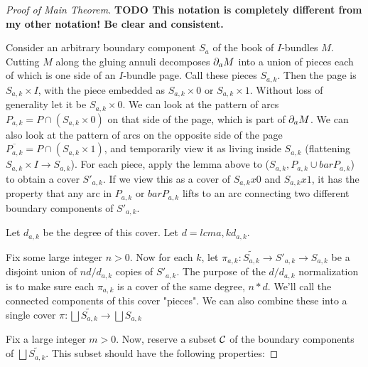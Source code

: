 \begin{proof}[Proof of Main Theorem]


\textbf{ TODO This notation is completely different from my other notation! Be
clear and consistent.}

Consider an arbitrary boundary component $S_a$ of the book of $I$-bundles $M$.
Cutting $M$ along the gluing annuli decomposes $\partial_aM$ into a union of pieces
each of which is one side of an $I$-bundle page. Call these pieces $S_{a,k}$.
Then the page is $S_{a,k}\times I$, with the piece embedded as $S_{a,k}\times
0$ or $S_{a,k}\times 1$. Without loss of generality let it be $S_{a,k}\times
0$. We can look at the pattern of arcs $P_{a,k} = P \cap (S_{a,k}\times 0)$ on
that side of the page, which is part of $\partial_aM$. We can also look at the pattern
of arcs on the opposite side of the page $\overline{P_{a,k}} = P \cap
(S_{a,k}\times 1)$, and temporarily view it as living inside $S_{a,k}$
(flattening $S_{a,k}\times I \to S_{a,k}$).  For each piece, apply the lemma
above to ($S_{a,k},P_{a,k} \cup barP_{a,k}$) to obtain a cover $S'_{a,k}$. If we
view this as a cover of $S_{a,k}x0$ and $S_{a,k}x1$, it has the property that
any arc in $P_{a,k}$ or $barP_{a,k}$ lifts to an arc connecting two different
boundary components of $S'_{a,k}$.

Let $d_{a,k}$ be the degree of this cover. Let $d = lcm a,k d_{a,k}$.

Fix some large integer $n>0$. Now for each $k$, let $\pi_{a,k}
\colon \widetilde{S_{a,k}} \to S'_{a,k} \to S_{a,k}$ be a disjoint union of $nd/d_{a,k}$
copies of $S'_{a,k}$. The purpose of the $d/d_{a,k}$ normalization is to make sure
each $\pi_{a,k}$ is a cover of the same degree, $n*d$.  We'll call the connected
components of this cover "pieces". We can also combine these into a single
cover $\pi \colon \bigsqcup \widetilde{S_{a,k}} \to \bigsqcup S_{a,k}$

Fix a large integer $m>0$. Now, reserve a subset $\mathcal{C}$ of the boundary
components of $\bigsqcup \widetilde{S_{a,k}}$.  This subset should have the following
properties:


\end{proof}
